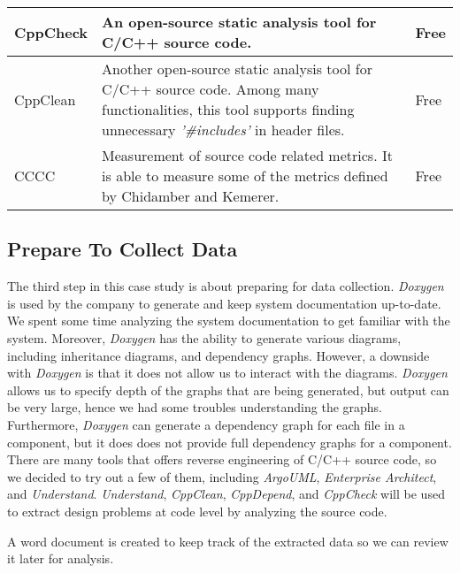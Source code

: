 \begin{table}[ht!]
{\begin{tabular}{|l|l|l}
		CppCheck & An open-source static analysis tool for C/C++ source code. & Free \\ \hline

		CppClean & Another open-source static analysis tool for C/C++ source code. Among many functionalities, this tool supports finding unnecessary \textit{'\#includes'} in header files. & Free \\ \hline

		CCCC & Measurement of source code related metrics. It is able to measure some of the metrics defined by Chidamber and Kemerer\cite{chidamber1994metrics}. & Free \\ \hline
	\end{tabular}}
\end{table}





\subsection{Prepare To Collect Data}
The third step in this case study is about preparing for data collection. \textit{Doxygen} is used by the company to generate and keep system documentation up-to-date. We spent some time analyzing the system documentation to get familiar with the system. Moreover, \textit{Doxygen} has the ability to generate various diagrams, including inheritance diagrams, and dependency graphs. However, a downside with \textit{Doxygen} is that it does not allow us to interact with the diagrams. \textit{Doxygen} allows us to specify depth of the graphs that are being generated, but output can be very large, hence we had some troubles understanding the graphs. Furthermore, \textit{Doxygen} can generate a dependency graph for each file in a component, but it does does not provide full dependency graphs for a component. There are many tools that offers reverse engineering of C/C++ source code, so we decided to try out a few of them, including \textit{ArgoUML}, \textit{Enterprise Architect}, and \textit{Understand}. \textit{Understand}, \textit{CppClean}, \textit{CppDepend}, and \textit{CppCheck} will be used to extract design problems at code level by analyzing the source code. 

A word document is created to keep track of the extracted data so we can review it later for analysis. 


